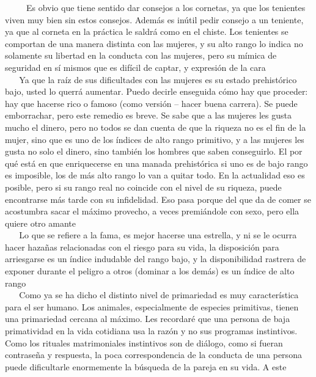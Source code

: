 ~ ~ ~ Es obvio que tiene sentido dar consejos a los cornetas, ya que los
tenientes viven muy bien sin estos consejos. Además es inútil pedir
consejo a un teniente, ya que al corneta en la práctica le saldrá como
en el chiste. Los tenientes se comportan de una manera distinta con las
mujeres, y su alto rango lo indica no solamente su libertad en la
conducta con las mujeres, pero su mímica de seguridad en sí mismos que
es difícil de captar, y expresión de la cara\\
\hspace*{0.333em} ~ ~ Ya que la raíz de sus dificultades con las mujeres
es su estado prehistórico bajo, usted lo querrá aumentar. Puedo decirle
enseguida cómo hay que proceder: hay que hacerse rico o famoso (como
versión -- hacer buena carrera). Se puede emborrachar, pero este remedio
es breve. Se sabe que a las mujeres les gusta mucho el dinero, pero no
todos se dan cuenta de que la riqueza no es el fin de la mujer, sino que
es uno de los índices de alto rango primitivo, y a las mujeres les gusta
no solo el dinero, sino también los hombres que saben conseguirlo. El
por qué está en que enriquecerse en una manada prehistórica si uno es de
bajo rango es imposible, los de más alto rango lo van a quitar todo. En
la actualidad eso es posible, pero si su rango real no coincide con el
nivel de su riqueza, puede encontrarse más tarde con su infidelidad. Eso
pasa porque del que da de comer se acostumbra sacar el máximo provecho,
a veces premiándole con sexo, pero ella quiere otro amante\\
\hspace*{0.333em} ~ ~ Lo que se refiere a la fama, es mejor hacerse una
estrella, y ni se le ocurra hacer hazañas relacionadas con el riesgo
para su vida, la disposición para arriesgarse es un índice indudable del
rango bajo, y la disponibilidad rastrera de exponer durante el peligro a
otros (dominar a los demás) es un índice de alto rango\\
\hspace*{0.333em} ~ ~ Como ya se ha dicho el distinto nivel de
primariedad es muy característica para el ser humano. Los animales,
especialmente de especies primitivas, tienen una primariedad cercana al
máximo. Les recordaré que una persona de baja primatividad en la vida
cotidiana usa la razón y no sus programas instintivos. Como los rituales
matrimoniales instintivos son de diálogo, como si fueran contraseña y
respuesta, la poca correspondencia de la conducta de una persona puede
dificultarle enormemente la búsqueda de la pareja en su vida. A este
